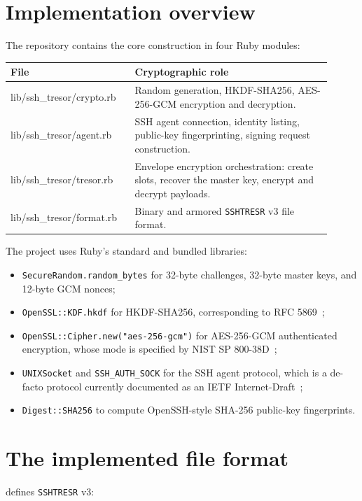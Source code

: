 \documentclass[11pt]{article}
\theoremstyle{definition}
\theoremstyle{plain}
\newcommand{\Tresor}{\texttt{SSHTRESR}}
\begin{document}
\section{Implementation overview}

The repository contains the core construction in four Ruby modules:

\begin{longtable}{>{\ttfamily}p{0.33\linewidth}p{0.58\linewidth}}
\toprule
File & Cryptographic role \\
\midrule
\endhead
lib/ssh\_tresor/crypto.rb & Random generation, HKDF-SHA256, AES-256-GCM encryption and decryption. \\
lib/ssh\_tresor/agent.rb & SSH agent connection, identity listing, public-key fingerprinting, signing request construction. \\
lib/ssh\_tresor/tresor.rb & Envelope encryption orchestration: create slots, recover the master key, encrypt and decrypt payloads. \\
lib/ssh\_tresor/format.rb & Binary and armored \Tresor{} v3 file format. \\
\bottomrule
\end{longtable}

The project uses Ruby's standard and bundled libraries:

\begin{itemize}[leftmargin=*]
  \item \texttt{SecureRandom.random\_bytes} for 32-byte challenges, 32-byte master keys, and 12-byte GCM nonces;
  \item \texttt{OpenSSL::KDF.hkdf} for HKDF-SHA256, corresponding to RFC 5869~\cite{rfc5869};
  \item \texttt{OpenSSL::Cipher.new("aes-256-gcm")} for AES-256-GCM authenticated encryption, whose mode is specified by NIST SP 800-38D~\cite{nist-gcm};
  \item \texttt{UNIXSocket} and \texttt{SSH\_AUTH\_SOCK} for the SSH agent protocol, which is a de-facto protocol currently documented as an IETF Internet-Draft~\cite{ssh-agent-draft};
  \item \texttt{Digest::SHA256} to compute OpenSSH-style SHA-256 public-key fingerprints.
\end{itemize}

\section{The implemented file format}

 defines \Tresor{} v3:
\end{document}
